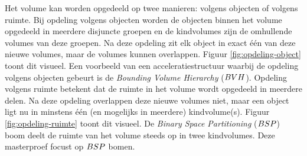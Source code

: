 Het volume kan worden opgedeeld op twee manieren: volgens objecten of volgens ruimte.
Bij opdeling volgens objecten worden de objecten binnen het volume opgedeeld in meerdere disjuncte groepen en de kindvolumes zijn de omhullende volumes van deze groepen.
Na deze opdeling zit elk object in exact één van deze nieuwe volumes, maar de volumes kunnen overlappen.
Figuur \ref{fig:opdeling-object} toont dit visueel.
Een voorbeeld van een acceleratiestructuur waarbij de opdeling volgens objecten gebeurt is de \textit{Bounding Volume Hierarchy} ($BVH$).
Opdeling volgens ruimte betekent dat de ruimte in het volume wordt opgedeeld in meerdere delen.
Na deze opdeling overlappen deze nieuwe volumes niet, maar een object ligt nu in minstens één (en mogelijks in meerdere) kindvolume(s).
Figuur \ref{fig:opdeling-ruimte} toont dit visueel.
De \textit{Binary Space Partitioning} ($BSP$) boom deelt de ruimte van het volume steeds op in twee kindvolumes.
Deze masterproef focust op $BSP$ bomen.

